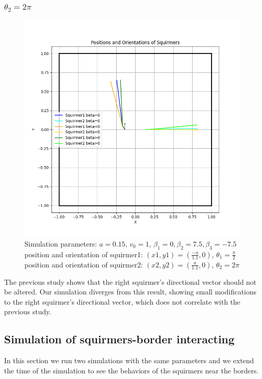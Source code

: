 \documentclass{article}
\begin{document}
\subsubsection{$\theta_2 = 2\pi$}
\begin{figure}[h]
   \centering
   \includegraphics[width=1\textwidth]{graphs/simulations/twosquirmerinter/sq2.2pi.png}
   \caption{\footnotesize Simulation parameters: $a=0.15$, $v_0=1$, $\beta_1=0, \beta_2=7.5, \beta_3=-7.5$\\
   position and orientation of squirmer1: $(x1,y1)=(\frac{-a}{1.1},0)$, $\theta_1=\frac{\pi}{2}$\\
   position and orientation of squirmer2: $(x2,y2)=(\frac{a}{1.1},0)$, $\theta_2=2\pi$}
\end{figure}
The previous study shows that the right squirmer's directional vector should not be altered. 
Our simulation diverges from this result, showing small modifications to the right squirmer's 
directional vector, which does not correlate with the previous study.

\newpage
\subsection{Simulation of squirmers-border interacting}
In this section we run two simulations with the same parameters and we extend the time of the simulation
 to see the behaviors of the squirmers near the borders.
\end{document}
